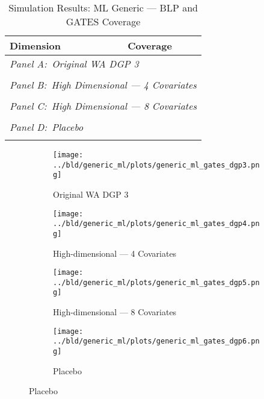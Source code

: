 \documentclass[11pt, a4paper, leqno]{article}
\begin{document}
\begin{table}
    \caption{Simulation Results: ML Generic --- BLP and GATES Coverage}
    \center
    \begin{tabular}{lccccccc}
        Dimension & \multicolumn{7}{c}{Coverage} \\
        \toprule
        \multicolumn{8}{l}{\textit{Panel A:\ Original WA DGP 3}} \\
         \\
        \midrule

        \multicolumn{8}{l}{\textit{Panel B:\ High Dimensional --- 4 Covariates}} \\
         \\
        \midrule

        \multicolumn{8}{l}{\textit{Panel C:\ High Dimensional --- 8 Covariates}} \\
         \\
        \midrule

        \multicolumn{8}{l}{\textit{Panel D:\ Placebo}} \\
         \\
        \bottomrule
    \end{tabular}

\end{table}

\begin{figure}
    \caption{Simulation Results: Generic ML --- GATES}\label{fig:gates}

    \centering
     \begin{subfigure}[b]{0.475\textwidth}
         \centering
         \texttt{[image: ../bld/generic\_ml/plots/generic\_ml\_gates\_dgp3.png]}
         \caption{Original WA DGP 3}\label{fig_gates:dgp3}
     \end{subfigure}
     \hfill
     \begin{subfigure}[b]{0.475\textwidth}
         \centering
         \texttt{[image: ../bld/generic\_ml/plots/generic\_ml\_gates\_dgp4.png]}
         \caption{High-dimensional --- 4 Covariates}\label{fig_gates:dgp4}
     \end{subfigure}

     \begin{subfigure}[b]{0.475\textwidth}
         \centering
         \texttt{[image: ../bld/generic\_ml/plots/generic\_ml\_gates\_dgp5.png]}
         \caption{High-dimensional --- 8 Covariates}\label{fig_gates:dgp5}
     \end{subfigure}
     \begin{subfigure}[b]{0.475\textwidth}
         \centering
         \texttt{[image: ../bld/generic\_ml/plots/generic\_ml\_gates\_dgp6.png]}
         \caption{Placebo}\label{fig_gates:dgp6}
     \end{subfigure}

\end{figure}
\end{document}
